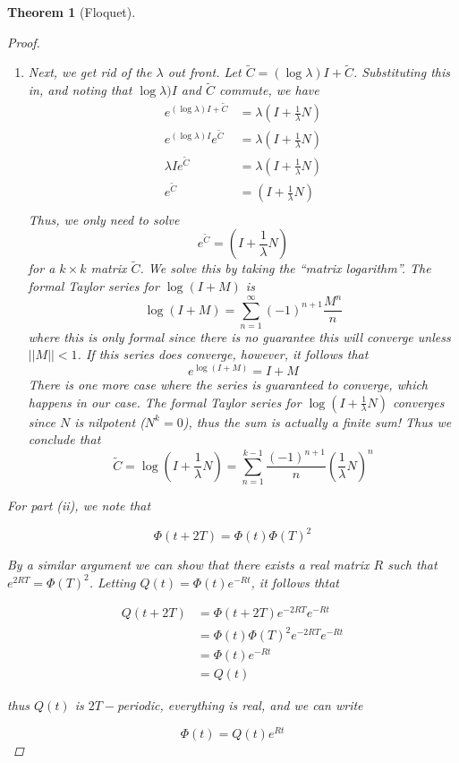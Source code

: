 \documentclass{article}
\newtheorem{theorem}{Theorem}[section]
\begin{document}
\begin{theorem}[Floquet]
\begin{proof}
\begin{enumerate}
\[
J = \lambda\left(I + \frac{1}{\lambda}N\right)
\]
Thus we only need to solve
\[
e^{C} = \lambda\left(I + \frac{1}{\lambda}N\right)
\]
for a $k \times k$ matrix $C$.
\item Next, we get rid of the $\lambda$ out front. Let $\tilde{C} = (\log \lambda)I + \tilde{C}$. Substituting this in, and noting that $\log \lambda)I$ and $\tilde{C}$ commute, we have
\begin{align*}
e^{(\log \lambda)I + \tilde{C}} &= \lambda\left(I + \frac{1}{\lambda}N\right) \\
e^{(\log \lambda)I} e^{\tilde{C}} &= \lambda\left(I + \frac{1}{\lambda}N\right) \\
\lambda I e^{\tilde C} &= \lambda\left(I + \frac{1}{\lambda}N\right) \\
e^{\tilde C} &= \left(I + \frac{1}{\lambda}N\right) \\
\end{align*}
Thus, we only need to solve 
\[
e^{\tilde C} = \left(I + \frac{1}{\lambda}N\right)
\]
for a $k \times k$ matrix $\tilde{C}$. We solve this by taking the ``matrix logarithm''. The formal Taylor series for $\log(I + M)$ is
\[
\log(I + M) = \sum_{n=1}^\infty (-1)^{n+1} \frac{M^n}{n}
\]
where this is only formal since there is no guarantee this will converge unless $||M|| < 1$. If this series does converge, however, it follows that
\[
e^{\log(I+M)} = I + M
\]
There is one more case where the series is guaranteed to converge, which happens in our case. The formal Taylor series for $\log(I + \frac{1}{\lambda}N)$ converges since $N$ is nilpotent ($N^k = 0$), thus the sum is actually a finite sum! Thus we conclude that 
\[
\tilde{C} = \log\left( I + \frac{1}{\lambda}N \right) = \sum_{n=1}^{k-1} \frac{(-1)^{n+1}}{n} \left( \frac{1}{\lambda}N \right)^n
\]
\end{enumerate}

For part (ii), we note that

\[
\Phi(t + 2T) = \Phi(t)\Phi(T)^2
\]

By a similar argument we can show that there exists a real matrix $R$ such that $e^{2RT} = \Phi(T)^2$. Letting $Q(t) = \Phi(t)e^{-Rt}$, it follows thtat

\begin{align*}
Q(t+2T) &= \Phi(t+2T)e^{-2RT}e^{-Rt} \\
&= \Phi(t)\Phi(T)^2 e^{-2RT} e^{-Rt} \\
&= \Phi(t) e^{-Rt} \\
&= Q(t)
\end{align*}

thus $Q(t)$ is $2T-$periodic, everything is real, and we can write

\[
\Phi(t) = Q(t) e^{Rt}
\]

\end{proof}
\end{theorem}
\end{document}
